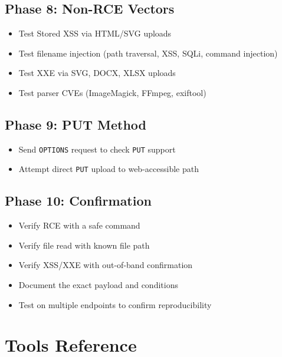 \documentclass[11pt]{article}
\begin{document}
\begin{checklistbox}
\subsection*{Phase 8: Non-RCE Vectors}
\begin{itemize}
    \item[$\square$] Test Stored XSS via HTML/SVG uploads
    \item[$\square$] Test filename injection (path traversal, XSS, SQLi, command injection)
    \item[$\square$] Test XXE via SVG, DOCX, XLSX uploads
    \item[$\square$] Test parser CVEs (ImageMagick, FFmpeg, exiftool)
\end{itemize}

\subsection*{Phase 9: PUT Method}
\begin{itemize}
    \item[$\square$] Send \texttt{OPTIONS} request to check \texttt{PUT} support
    \item[$\square$] Attempt direct \texttt{PUT} upload to web-accessible path
\end{itemize}

\subsection*{Phase 10: Confirmation}
\begin{itemize}
    \item[$\square$] Verify RCE with a safe command
    \item[$\square$] Verify file read with known file path
    \item[$\square$] Verify XSS/XXE with out-of-band confirmation
    \item[$\square$] Document the exact payload and conditions
    \item[$\square$] Test on multiple endpoints to confirm reproducibility
\end{itemize}
\end{checklistbox}

\section{Tools Reference}
\end{document}
